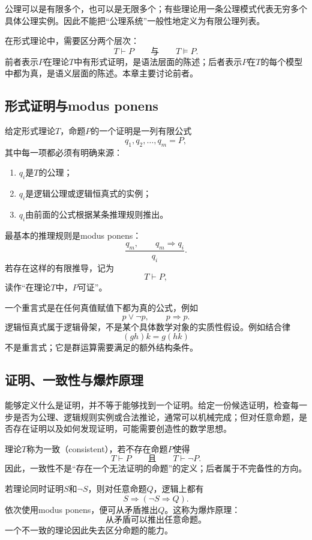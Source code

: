 公理可以是有限多个，也可以是无限多个；有些理论用一条公理模式代表无穷多个具体公理实例。因此不能把“公理系统”一般性地定义为有限公理列表。

在形式理论中，需要区分两个层次：
\[
    T\vdash P
    \qquad\text{与}\qquad
    T\models P.
\]
前者表示$P$在理论$T$中有形式证明，是语法层面的陈述；后者表示$P$在$T$的每个模型中都为真，是语义层面的陈述。本章主要讨论前者。

\subsection{形式证明与modus ponens}

给定形式理论$T$，命题$P$的一个证明是一列有限公式
\[
    q_1,q_2,\ldots,q_m=P,
\]
其中每一项都必须有明确来源：
\begin{enumerate}
    \item $q_i$是$T$的公理；
    \item $q_i$是逻辑公理或逻辑恒真式的实例；
    \item $q_i$由前面的公式根据某条推理规则推出。
\end{enumerate}

最基本的推理规则是modus ponens：
\[
    \frac{q_m,\qquad q_m\Rightarrow q_i}{q_i}.
\]
若存在这样的有限推导，记为
\[
    T\vdash P,
\]
读作“在理论$T$中，$P$可证”。

一个重言式是在任何真值赋值下都为真的公式，例如
\[
    p\lor\neg p,
    \qquad
    p\Rightarrow p.
\]
逻辑恒真式属于逻辑骨架，不是某个具体数学对象的实质性假设。例如结合律
\[
    (gh)k=g(hk)
\]
不是重言式；它是群运算需要满足的额外结构条件。

\subsection{证明、一致性与爆炸原理}

能够定义什么是证明，并不等于能够找到一个证明。给定一份候选证明，检查每一步是否为公理、逻辑规则实例或合法推论，通常可以机械完成；但对任意命题，是否存在证明以及如何发现证明，可能需要创造性的数学思想。

理论$T$称为一致（consistent），若不存在命题$P$使得
\[
    T\vdash P
    \qquad\text{且}\qquad
    T\vdash\neg P.
\]
因此，一致性不是“存在一个无法证明的命题”的定义；后者属于不完备性的方向。

若理论同时证明$S$和$\neg S$，则对任意命题$Q$，逻辑上都有
\[
    S\Rightarrow(\neg S\Rightarrow Q).
\]
依次使用modus ponens，便可从矛盾推出$Q$。这称为爆炸原理：
\[
    \boxed{\text{从矛盾可以推出任意命题。}}
\]
一个不一致的理论因此失去区分命题的能力。

